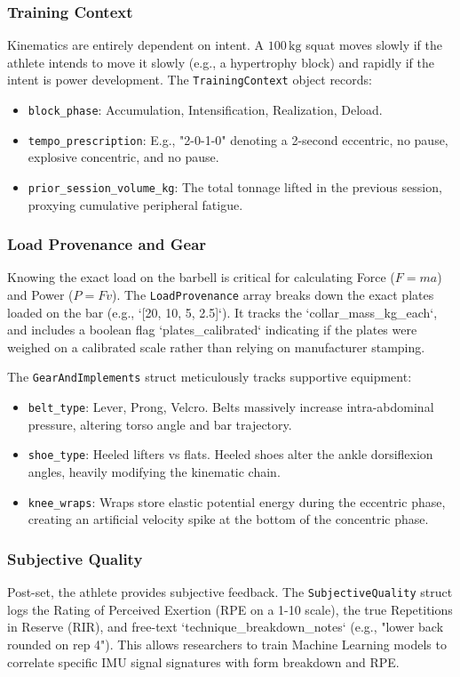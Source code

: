 \subsubsection{Training Context}
Kinematics are entirely dependent on intent. A $100\,\text{kg}$ squat moves slowly if the athlete intends to move it slowly (e.g., a hypertrophy block) and rapidly if the intent is power development. The \texttt{TrainingContext} object records:
\begin{itemize}
    \item \texttt{block\_phase}: Accumulation, Intensification, Realization, Deload.
    \item \texttt{tempo\_prescription}: E.g., "2-0-1-0" denoting a 2-second eccentric, no pause, explosive concentric, and no pause.
    \item \texttt{prior\_session\_volume\_kg}: The total tonnage lifted in the previous session, proxying cumulative peripheral fatigue.
\end{itemize}

\subsubsection{Load Provenance and Gear}
Knowing the exact load on the barbell is critical for calculating Force ($F=ma$) and Power ($P=Fv$).
The \texttt{LoadProvenance} array breaks down the exact plates loaded on the bar (e.g., `[20, 10, 5, 2.5]`). It tracks the `collar_mass_kg_each`, and includes a boolean flag `plates_calibrated` indicating if the plates were weighed on a calibrated scale rather than relying on manufacturer stamping.

The \texttt{GearAndImplements} struct meticulously tracks supportive equipment:
\begin{itemize}
    \item \texttt{belt\_type}: Lever, Prong, Velcro. Belts massively increase intra-abdominal pressure, altering torso angle and bar trajectory.
    \item \texttt{shoe\_type}: Heeled lifters vs flats. Heeled shoes alter the ankle dorsiflexion angles, heavily modifying the kinematic chain.
    \item \texttt{knee\_wraps}: Wraps store elastic potential energy during the eccentric phase, creating an artificial velocity spike at the bottom of the concentric phase.
\end{itemize}

\subsubsection{Subjective Quality}
Post-set, the athlete provides subjective feedback. The \texttt{SubjectiveQuality} struct logs the Rating of Perceived Exertion (RPE on a 1-10 scale), the true Repetitions in Reserve (RIR), and free-text `technique_breakdown_notes` (e.g., "lower back rounded on rep 4"). This allows researchers to train Machine Learning models to correlate specific IMU signal signatures with form breakdown and RPE.

